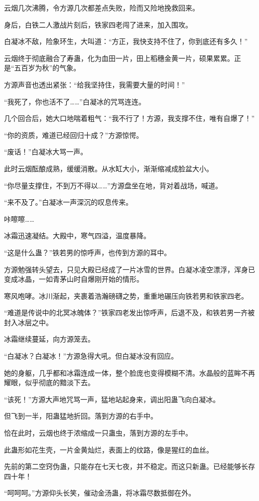 \begin{this_body}
云烟几次沸腾，令方源几次都差点失败，险而又险地挽救回来。

身后，白铁二人激战片刻后，铁家四老闯了进来，加入围攻。

白凝冰不敌，险象环生，大叫道：“方正，我快支持不住了，你到底还有多久！”

云烟终于彻底融合了寿蛊，化为血田一片，田上稻穗金黄一片，硕果累累。正是“五百岁为秋”的气象。

方源声音也透出紧张：“给我坚持住，我需要大量的时间！”

“我死了，你也活不了……”白凝冰的咒骂连连。

几个回合后，她大口地喘着粗气：“我不行了！方源，我支撑不住，唯有自爆了！”

“你的资质，难道已经回归十成？”方源惊愕。

“废话！”白凝冰大骂一声。

此时云烟酝酿成熟，缓缓消散。从水缸大小，渐渐缩减成脸盆大小。

“你尽量支撑住，不到万不得以……”方源盘坐在地，背对着战场，喊道。

“来不及了。”白凝冰一声深沉的叹息传来。

咔嚓嚓……

冰霜迅速凝结。大殿中，寒气四溢，温度暴降。

“这是什么蛊？”铁若男的惊呼声，也传到方源的耳中。

方源勉强转头望去，只见大殿已经成了一片冰雪的世界。白凝冰凌空漂浮，浑身已变成冰晶，一如青茅山时自爆刚开始的情形。

寒风咆哮。冰川渐起，夹裹着浩瀚磅礴之势，重重地碾压向铁若男和铁家四老。

“难道是传说中的北冥冰魄体？”铁家四老发出惊呼声，后退不及，和铁若男一齐被封入冰层之中。

冰霜继续蔓延，向方源笼去。

“白凝冰？白凝冰！”方源急得大吼。但白凝冰没有回应。

她的身躯，几乎都和冰霜连成一体，整个脸庞也变得模糊不清。水晶般的蓝眸不再耀眼，似乎彻底的黯淡下去。

“该死！”方源大声地咒骂一声，猛地站起身来，调出阳蛊飞向白凝冰。

但飞到一半，阳蛊猛地折回。落到方源的右手中。

恰在此时，云烟也终于浓缩成一只蛊虫，落到方源的左手中。

此蛊形如花生壳，一片金黄灿烂，表面上的纹路，像是猩红的血丝。

先前的第二空窍伪蛊，只能存在七天七夜，并不稳定。而这只新蛊。已经能够长存四十年！

“呵呵呵。”方源仰头长笑，催动金汤蛊，将冰霜尽数抵御在外。


\end{this_body}

